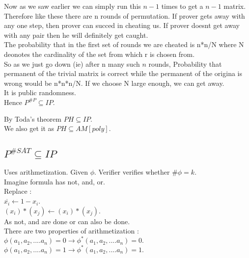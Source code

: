 \documentclass[solution,addpoints,12pt]{exam}
\begin{document}
\begin{itemize}
Now as we saw earlier we can simply run this $n-1$ times to get a
$n-1$ matrix. Therefore like these there are n rounds of permutation.
If prover gets away with any one step, then prover can succed in
cheating us. If prover doesnt get away with any pair then he will
definitely get caught.\\
The probability that in the first set of rounds we are
cheated is n*n/N where N deonotes the cardinality of the
set from which r is chosen from.\\
So as we just go down (ie) after n many such $n$ rounds,
Probability that permanent of the trivial matrix
is correct while the permanent of the origina is wrong
would be n*n*n/N. If we choose N large enough, we can get away.\\
It is public randomness.\\
Hence $P^{\#P} \subseteq IP$.\\
\end{itemize}
By Toda's theorem $PH \subseteq IP$.\\
We also get it as $PH \subseteq AM[poly]$.\\

\subsection{$P^{\#SAT} \subseteq IP$}
Uses arithmetization. Given $\phi$.
Verifier verifies whether $\#\phi = k$.\\
Imagine formula has not, and, or.\\
Replace :\\
$\overline{x_i} \leftarrow 1 - x_i$.\\
$(x_i)*(x_j) \leftarrow (x_i)*(x_j)$.\\
As not, and are done or can also be done.\\
There are two properties of arithmetization :\\
$\phi(a_1, a_2, .... a_n) = 0 \rightarrow
\phi^*(a_1, a_2, .... a_n) = 0.$\\
$\phi(a_1, a_2, .... a_n) = 1 \rightarrow
\phi^*(a_1, a_2, .... a_n) = 1.$\\
\end{document}
